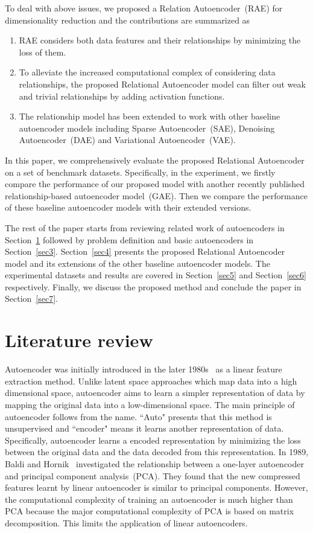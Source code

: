 \documentclass[conference]{IEEEtran}
\begin{document}
	To deal with above issues, we proposed a Relation Autoencoder~(RAE) for dimensionality reduction and the contributions are summarized as
	\begin{enumerate}
		\item RAE considers both data features and their relationships by minimizing the loss of them.
		\item To alleviate the increased computational complex of considering data relationships, the proposed Relational Autoencoder model can filter out weak and trivial relationships by adding activation functions.
		\item The relationship model has been extended to work with other baseline autoencoder models including Sparse Autoencoder~(SAE), Denoising Autoencoder~(DAE) and Variational Autoencoder~(VAE).
	\end{enumerate}
	In this paper, we comprehensively evaluate the proposed Relational Autoencoder on a set of benchmark datasets. Specifically, in the experiment, we firstly compare the performance of our proposed model with another recently published relationship-based autoencoder model~(GAE). Then we compare the performance of these baseline autoencoder models with their extended versions.
	
	The rest of the paper starts from reviewing related work of autoencoders in Section~\ref{sec2} followed by problem definition and basic autoencoders in Section~\ref{sec3}. Section~\ref{sec4} presents the proposed Relational Autoencoder model and its extensions of the other baseline autoencoder models. The experimental datasets and results are covered in Section~\ref{sec5} and Section~\ref{sec6} respectively. Finally, we discuss the proposed method and conclude the paper in Section~\ref{sec7}.
	
	\section{Literature review} \label{sec2}
	Autoencoder was initially introduced in the later 1980s~\cite{rumerhart1986learning} as a linear feature extraction method. Unlike latent space approaches which map data into a high dimensional space, autoencoder aims to learn a simpler representation of data by mapping the original data into a low-dimensional space. The main principle of autoencoder follows from the name. ``Auto" presents that this method is unsupervised and ``encoder" means it learns another representation of data. Specifically, autoencoder learns a encoded representation by minimizing the loss between the original data and the data decoded from this representation. In 1989, Baldi and Hornik~\cite{baldi1989neural} investigated the relationship between a one-layer autoencoder and principal component analysis~(PCA). They found that the new compressed features learnt by linear autoencoder is similar to principal components. However, the computational complexity of training an autoencoder is much higher than PCA because the major computational complexity of PCA is based on matrix decomposition. This limits the application of linear autoencoders.
	
\end{document}

